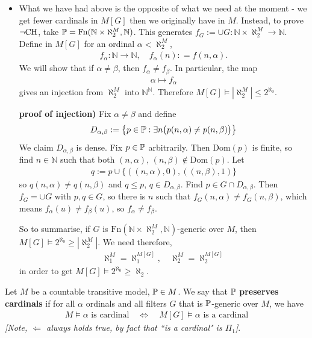 \documentclass[12pt,a4paper]{article}
\newenvironment{subproof}
{\begin{changemargin}{0.5cm}{0.5cm} 
	}%
	{\end{changemargin}
}
\begin{document}
\begin{itemize}
\item What we have had above is the opposite of what we need at the moment - we get fewer cardinals in $M[G]$ then we originally have in $M$. Instead, to prove $\neg \text{CH}$, take $\mathbb{P} = \text{Fn}(\mathbb{N} \times \aleph_2^M, \mathbb{N})$. This generates $f_G := \cup G : \mathbb{N} \times \aleph_2^M \rightarrow \mathbb{N}$. Define in $M[G]$ for an ordinal $\alpha < \aleph_2^M$,
\begin{align*}
f_{\alpha} : \mathbb{N} \rightarrow \mathbb{N}, \quad f_{\alpha}(n) : = f(n, \alpha). 
\end{align*} 
We will show that if $\alpha \neq \beta$, then $f_{\alpha} \neq f_{\beta}$. In particular, the map
\begin{align*}
\alpha \mapsto f_{\alpha}
\end{align*}
gives an injection from $\aleph_2^M$ into $\mathbb{N}^{\mathbb{N}}$. Therefore $M[G] \models |\aleph_2^M| \leq 2^{\aleph_0}$.
\begin{subproof}
\textbf{proof of injection)} Fix $\alpha \neq \beta$ and define
\begin{align*}
D_{\alpha , \beta} : = \big\{p\in \mathbb{P} : \exists n \big(p(n, \alpha) \neq p(n, \beta)\big)\big\}
\end{align*}
We claim $D_{\alpha, \beta}$ is dense. Fix $p\in \mathbb{P}$ arbitrarily. Then $\text{Dom}(p)$ is finite, so find $n\in \mathbb{N}$ such that both $(n, \alpha)$, $(n, \beta) \not\in \text{Dom}(p)$. Let
\begin{align*}
q:= p \cup \{((n, \alpha), 0), ((n, \beta), 1)\}
\end{align*}
so $q(n, \alpha) \neq q(n, \beta)$ and $q\leq p$, $q\in D_{\alpha, \beta}$. Find $p\in  G\cap D_{\alpha, \beta}$. Then $f_G =\cup G$ with $p,q\in G$, so there is $n$ such that $f_G(n, \alpha) \neq f_G(n, \beta)$, which means $f_{\alpha}(u) \neq f_{\beta}(u)$, so $f_{\alpha} \neq f_{\beta}$.

\eop 
\end{subproof}
So to summarise, if $G$ is $\text{Fn}(\mathbb{N} \times \aleph_2^M, \mathbb{N})$-generic over $M$, then $M[G] \models 2^{\aleph_0} \geq |\aleph_2^M|$. We need therefore,
\begin{align*}
\aleph_1^M = \aleph_1^{M[G]}, \quad \aleph_2^M = \aleph_2^{M[G]}
\end{align*} 
in order to get $M[G] \models 2^{\aleph_0} \geq \aleph_2$.
\end{itemize}
\s

 Let $M$ be a countable transitive model, $\mathbb{P} \in M$. We say that $\mathbb{P}$ \textbf{preserves cardinals} if for all $\alpha$ ordinals and all filters $G$ that is $\mathbb{P}$-generic over $M$, we have
\begin{align*}
M \models \alpha \text{ is cardinal} \quad \Leftrightarrow \quad M[G] \models \alpha \text{ is a cardinal}
\end{align*}
\emph{[Note,  $\Leftarrow$ always holds true, by fact that ``is a cardinal" is $\Pi_1$]}.
\s
\end{document}
